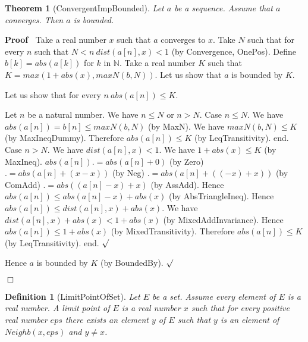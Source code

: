 \documentclass{article}
\newenvironment{forthel}{\begin{leftbar}}{\end{leftbar}}
\newenvironment{proof}{\noindent\textbf{Proof\ }}{\hspace*{\fill}$\Box$\medskip}
\newenvironment{subproof}{\begin{list}{}{}
		\item[\text{Proof}]}{\hfill $\surd$ \end{list}}
\newtheorem{theorem}{Theorem}
\newtheorem{definition}{Definition}
\newcommand{\NN}{\mathbb{N}}
\begin{document}
\begin{forthel}
	\begin{theorem}[ConvergentImpBounded]
	Let $a$ be a sequence. Assume that $a$ converges. Then $a$ is bounded.
	\end{theorem}
	\begin{proof}
	Take a real number $x$ such that $a$ converges to $x$.
	Take $N$ such that for every $n$ such that $N < n \ dist(a[n],x) < 1$ (by Convergence, OnePos).
	Define $b[k] = abs(a[k])$ for $k$ in $\NN$.
	Take a real number $K$ such that $K = max(1 + abs(x), maxN(b,N))$.
	Let us show that $a$ is bounded by $K$.
	\begin{subproof}
	Let us show that for every $n \ abs(a[n]) \leq K$.
	\begin{subproof} 
	Let $n$ be a natural number.
	We have $n \leq N$ or $n > N$.
	Case $n \leq N$.
	We have $abs(a[n]) = b[n] \leq maxN(b,N)$ (by MaxN).
	We have $maxN(b,N) \leq K$ (by MaxIneqDummy).
	Therefore $abs(a[n]) \leq K$ (by LeqTransitivity).
	end.
	Case $n > N$.
	We have $dist(a[n],x) < 1$.
	We have $1 + abs(x) \leq K$ (by MaxIneq).
	$abs(a[n]) .= abs(a[n] + 0)$ (by Zero)
	$.= abs(a[n] + (x - x))$ (by Neg)
	$.= abs(a[n] + ((-x) + x))$ (by ComAdd)
	$.= abs((a[n] - x) + x)$ (by AssAdd).
	Hence $abs(a[n]) \leq abs(a[n] - x) + abs(x)$ (by AbsTriangleIneq).
	Hence $abs(a[n]) \leq dist(a[n],x) + abs(x)$.
	We have $dist(a[n],x) + abs(x) < 1 + abs(x)$ (by MixedAddInvariance).
	Hence $abs(a[n]) \leq 1 + abs(x)$ (by MixedTransitivity).
	Therefore $abs(a[n]) \leq K$ (by LeqTransitivity).
	end.
	\end{subproof}
	Hence $a$ is bounded by $K$ (by BoundedBy).
	\end{subproof}
	\end{proof}
	
	\begin{definition}[LimitPointOfSet]
	Let $E$ be a set. Assume every element of $E$ is a real number. A limit point of $E$
	is a real number $x$ such that for every positive real number $eps$ there exists an element
	$y$ of $E$ such that $y$ is an element of $Neighb(x,eps)$ and $y \neq x$.
	\end{definition}
	

\end{forthel}
\end{document}
